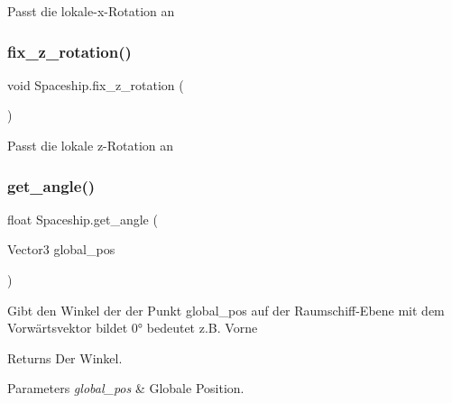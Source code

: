 Passt die lokale-\/x-\/\+Rotation an 

\mbox{\label{class_spaceship_ae5251fec3b08bf9b4e34e2e854e27e9f}} 
\subsubsection{\texorpdfstring{fix\+\_\+z\+\_\+rotation()}{fix\_z\_rotation()}}
{\footnotesize\ttfamily void Spaceship.\+fix\+\_\+z\+\_\+rotation (\begin{DoxyParamCaption}{ }\end{DoxyParamCaption})}



Passt die lokale z-\/\+Rotation an 

\mbox{\label{class_spaceship_a8cfcff835d6cba6b9fb8aa6841aa0cba}} 
\subsubsection{\texorpdfstring{get\+\_\+angle()}{get\_angle()}}
{\footnotesize\ttfamily float Spaceship.\+get\+\_\+angle (\begin{DoxyParamCaption}\item[{Vector3}]{global\+\_\+pos }\end{DoxyParamCaption})}



Gibt den Winkel der der Punkt global\+\_\+pos auf der Raumschiff-\/\+Ebene mit dem Vorwärtsvektor bildet 0° bedeutet z.\+B. Vorne 

\begin{DoxyReturn}{Returns}
Der Winkel.
\end{DoxyReturn}

\begin{DoxyParams}{Parameters}
{\em global\+\_\+pos} & Globale Position.\\
\hline
\end{DoxyParams}
\mbox{\label{class_spaceship_a35fbba50c658617e939fd2d82bf33fbf}} 
